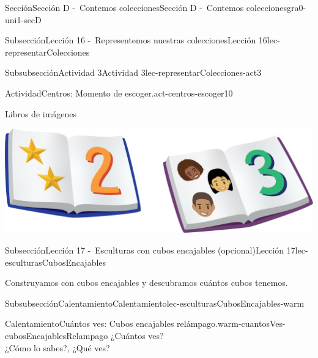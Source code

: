 \documentclass[twoside,10pt,]{article}
\begin{document}
\begin{sectionptx}{Sección}{Sección D -~Contemos colecciones}{}{Sección D -~Contemos colecciones}{}{}{gra0-uni1-secD}
\begin{subsectionptx}{Subsección}{Lección 16 -~Representemos nuestras colecciones}{}{Lección 16}{}{}{lec-representarColecciones}
\begin{subsubsectionptx}{Subsubsección}{Actividad 3}{}{Actividad 3}{}{}{lec-representarColecciones-act3}
\begin{activity}{Actividad}{Centros: Momento de escoger.}{act-centros-escoger10}
\begin{sidebyside}{2}{0.025}{0.025}{0.05}
\begin{sbspanel}{0.45}
\end{sbspanel}%
\begin{sbspanel}{0.45}%
Libros de imágenes%
\par
\includegraphics[width=\linewidth]{external/png-source/K.1.D Beta Student Workbooks.Books.png}
\end{sbspanel}%
\end{sidebyside}%
\end{activity}%
\end{subsubsectionptx}
\end{subsectionptx}
%
%
\typeout{************************************************}
\typeout{************************************************}
%
\begin{subsectionptx}{Subsección}{Lección 17 -~Esculturas con cubos encajables (opcional)}{}{Lección 17}{}{}{lec-esculturasCubosEncajables}
\begin{introduction}{}%
Construyamos con cubos encajables y descubramos cuántos cubos tenemos.%
\end{introduction}%
%
%
\typeout{************************************************}
\typeout{************************************************}
%
\begin{subsubsectionptx}{Subsubsección}{Calentamiento}{}{Calentamiento}{}{}{lec-esculturasCubosEncajables-warm}
\begin{exploration}{Calentamiento}{Cuántos ves: Cubos encajables relámpago.}{warm-cuantosVes-cubosEncajablesRelampago}%
¿Cuántos ves?\\
 ¿Cómo lo sabes?, ¿Qué ves?%
\begin{sidebyside}{3}{0.0166666666666667}{0.0166666666666667}{0.0333333333333333}%
\begin{sbspanel}{0.3}%

\end{sbspanel}
\end{sidebyside}
\end{exploration}
\end{subsubsectionptx}
\end{subsectionptx}
\end{sectionptx}
\end{document}
